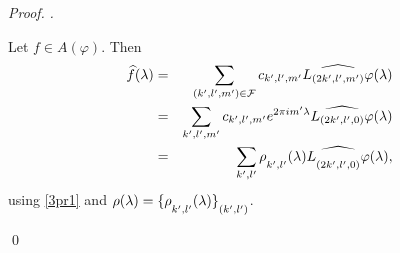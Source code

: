 \documentclass[a4paper,12pt,reqno]{amsart}
\theoremstyle{plain}
\numberwithin{equation}{section}
\theoremstyle{definition}
\newenvironment{pf}[1][]{%
 \vskip 3mm
 \noindent
 \ifthenelse{\equal{#1}{}}%
  {{\slshape Proof. }}%
  {{\slshape #1.} }%
 }%
{\qed\bigskip}
\begin{document}
\begin{pf}
Let $f\in A(\varphi)$. Then
\begin{eqnarray}
\widehat{f}(\lambda)&=&\sum\limits_{(k^{\prime},l^{\prime},m^{\prime})\in\mathcal{F}}
c_{k^{\prime},l^{\prime},m^{\prime}}\widehat {L_{(2k^{\prime},l^{\prime},m^{\prime})}\varphi}(\lambda)\nonumber\\
&=&\sum\limits_{k^{\prime},l^{\prime},m^{\prime}}c_{k^{\prime},l^{\prime},m^{\prime}} e^{2\pi im^{\prime}\lambda}\widehat {L_{(2k^{\prime},l^{\prime},0)}\varphi}(\lambda)\nonumber\\
&=&\sum\limits_{k^{\prime},l^{\prime}}\fontdimen16\textfont2=5pt \rho_{k^{\prime},l^{\prime}}(\lambda)\widehat {L_{(2k^{\prime},l^{\prime},0)}\varphi}(\lambda),\label{3pr5}
\end{eqnarray}
using \eqref{3pr1} and $\rho(\lambda)=\fontdimen16\textfont2=5pt \{\rho_{k^{\prime},l^{\prime}}(\lambda)\}_
{(k^{\prime},l^{\prime})}$.


\end{pf}
\end{document}
